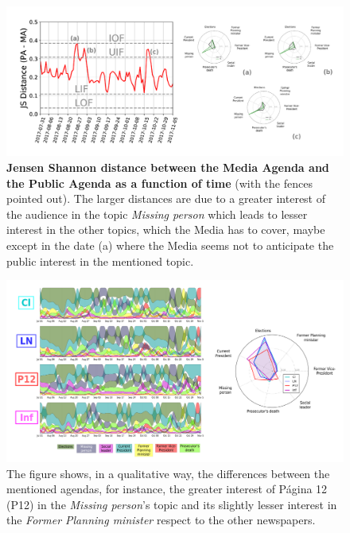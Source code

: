 \documentclass{bmcart}
\begin{document}
\begin{backmatter}
\begin{figure}[h!]
\includegraphics[width = \textwidth]{images/Fig4.pdf}
\caption{\textbf{Jensen Shannon distance between the Media Agenda and the Public Agenda as a function of time} (with the fences pointed out). The larger distances are due to a greater interest of the audience in the topic \emph{Missing person} which leads to lesser interest in the other topics, which the Media has to cover, maybe except in the date (a) where the Media seems not to anticipate the public interest in the mentioned topic.}
\label{fig:jensen_shannon_gt}
\end{figure}

\begin{figure}[h!]
\includegraphics[width = \textwidth]{images/Fig5.pdf}
\caption{ The figure shows, in a qualitative way, the differences between the mentioned agendas, for instance, the greater interest of Página 12 (P12) in the \emph{Missing person}’s topic and its slightly lesser interest in the \emph{Former Planning minister} respect to the other newspapers.}
\label{fig:news_agenda}
\end{figure}


\end{backmatter}
\end{document}
